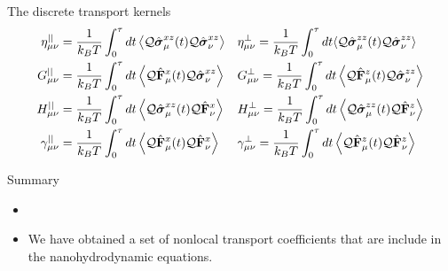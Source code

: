 \documentclass{beamer}
\begin{document}
\begin{frame}{The discrete transport kernels}
\begin{align}
\eta^{||}_{\mu\nu}&
=\frac{1}{k_BT}\int_0^\tau  dt\left\langle 
{\cal Q}\hat{\boldsymbol{\sigma}}^{xz}_\mu(t){\cal Q}\hat{\boldsymbol{\sigma}}^{xz}_\nu
\right\rangle&&
\eta^{\bot}_{\mu\nu}
= \frac{1}{k_BT}\int_0^\tau  dt\langle 
{\cal Q}\hat{\boldsymbol{\sigma}}^{zz}_\mu(t)
{\cal Q}\hat{\boldsymbol{\sigma}}^{zz}_\nu\rangle
\nonumber\\
G^{||}_{\mu\nu}&
=\frac{1}{k_BT} \int_0^\tau  dt
\left\langle{\cal Q}\hat{\bf F}^{x}_\mu(t)
{\cal Q}\hat{\boldsymbol{\sigma}}^{xz}_\nu
\right\rangle&&
G^{\bot}_{\mu\nu}=\frac{1}{k_BT} \int_0^\tau  dt
\left\langle {\cal Q}\hat{\bf F}^{z}_\mu(t)
{\cal Q}\hat{\boldsymbol{\sigma}}^{zz}_\nu
\right\rangle
\nonumber\\
H^{||}_{\mu\nu}&
=\frac{1}{k_BT} 
\int_0^\tau  dt
\left\langle{\cal Q}\hat{\boldsymbol{\sigma}}^{xz}_\mu(t){\cal Q}\hat{\bf F}^{x}_\nu\right\rangle&&
H^\bot_{\mu\nu}=\frac{1}{k_BT} 
\int_0^\tau  dt\left\langle {\cal Q}\hat{\boldsymbol{\sigma}}^{zz}_\mu(t){\cal Q}\hat{\bf F}^{z}_\nu\right\rangle
\nonumber\\
\gamma^{||}_{\mu\nu}&=
\frac{1}{k_BT} \int_0^\tau  dt
\left\langle 
{\cal Q}\hat{\bf F}^{x}_\mu(t)
{\cal Q}\hat{\bf F}^{x}_\nu\right\rangle&&
\gamma^{\bot}_{\mu\nu}=
\frac{1}{k_BT} \int_0^\tau  dt\left\langle 
{\cal Q}\hat{\bf F}^{z}_\mu(t){\cal Q}\hat{\bf F}^{z}_\nu
\right\rangle
\nonumber
\end{align}
\end{frame}

\begin{frame}{Summary}
  \begin{itemize}
    \item 
    \item We have obtained a set of nonlocal transport coefficients that are include in the nanohydrodynamic equations.
    \end{itemize}
\end{frame}
\end{document}
